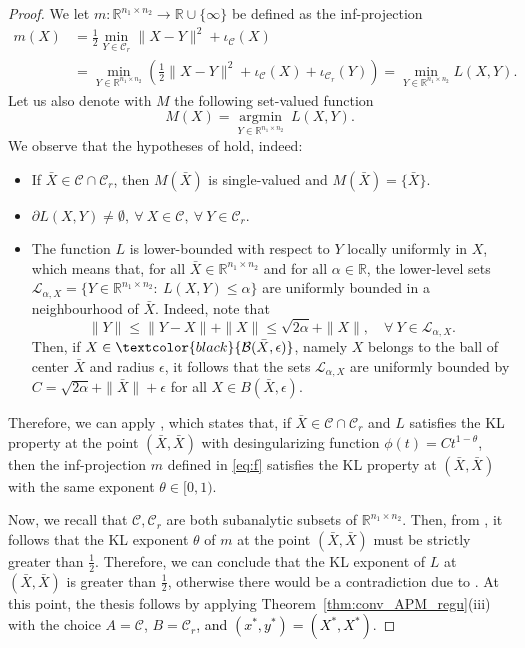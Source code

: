 \documentclass[pdflatex,sn-mathphys-num]{sn-jnl}
\numberwithin{equation}{section}%
\def\R{\mathbb{R}}
\newcommand{\setRank}{{\mathcal{C}_r}}
\newcommand{\setNorm}{{\mathcal{C} }}
\newcommand{\ste}[1]{\textcolor{black}{#1}}
\theoremstyle{thmstyleone}%
\theoremstyle{thmstyletwo}%
\theoremstyle{thmstylethree}%
\begin{document}
{\begin{proof}
We let $m:\R^{n_1\times n_2}\rightarrow \R\cup\{\infty\}$ be defined as the inf-projection
\begin{align}\label{eq:f}
    m(X) &= \frac{1}{2}\min_{Y\in \setRank}\|X-Y\|^2+\iota_\setNorm(X) \nonumber\\
    &= \min_{Y\in\R^{n_1\times n_2}}\left(\frac{1}{2}\|X-Y\|^2+\iota_\setNorm(X)+\iota_\setRank(Y)\right)=\min_{Y\in\R^{n_1\times n_2}}L(X,Y).
\end{align}
Let us also denote with $M$ the following set-valued function
\begin{equation}\label{eq:m}
    M(X) = \underset{Y\in \R^{n_1\times n_2}}{\operatorname{argmin}} \ L(X,Y).
\end{equation}
We observe that the hypotheses of \cite[Theorem 3.1]{Yu2022} hold, indeed:
\begin{itemize}
    \item If $\bar{X}\in \setNorm \cap \setRank$, then $M(\bar{X})$ is single-valued and $M(\bar{X})=\{\bar{X}\}$. 
    \item $\partial L(X,Y)\neq \emptyset, \ \forall \ X\in \setNorm, \ \forall \ Y\in \setRank.$
    \item The function $L$ is lower-bounded with respect to $Y$ locally uniformly in $X$, which means that, for all $\bar{X}\in\R^{n_1\times n_2}$ and for all $\alpha\in\R$, the lower-level sets $\mathcal{L}_{\alpha,X}=\{Y\in\R^{n_1\times n_2}: \ L(X,Y)\leq \alpha\}$ are uniformly bounded in a neighbourhood of $\bar{X}$. Indeed, note that
    \begin{equation*}
        \|Y\|\leq \|Y-X\|+\|X\|\leq \sqrt{2\alpha}+\|X\|, \quad \forall \ Y\in \mathcal{L}_{\alpha,X}.
    \end{equation*}
    Then, if $X\in \ste{\mathcal{B}(\bar{X},\epsilon)}$, namely $X$ belongs to the ball of center $\bar{X}$ and radius $\epsilon$, it follows that the sets $\mathcal{L}_{\alpha,X}$ are uniformly bounded by $C=\sqrt{2\alpha}+\|\bar{X}\|+\epsilon$ for all $X\in B(\bar{X},\epsilon)$.
\end{itemize}
Therefore, we can apply \cite[Theorem 3.1]{Yu2022}, which states that, if $\bar{X}\in \mathcal{C}\cap \mathcal{C}_r$ and $L$ satisfies the KL property at the point $(\bar{X},\bar{X})$ with desingularizing function $\phi(t)=Ct^{1-\theta}$, then the inf-projection $m$ defined in \eqref{eq:f} satisfies the KL property at $(\bar{X},\bar{X})$ with the same exponent $\theta\in[0,1)$. 

Now, we recall that $\mathcal{C},\mathcal{C}_r$ are both subanalytic subsets of $\R^{n_1\times n_2}$. Then, from \cite[Lemma 3]{Noll-etal-2016}, it follows that the KL exponent $\theta$ of $m$ at the point $(\bar{X},\bar{X})$ must be strictly greater than $\frac{1}{2}$. Therefore, we can conclude that the KL exponent of $L$ at $(\bar{X},\bar{X})$ is greater than $\frac{1}{2}$, otherwise there would be a contradiction due to \cite[Theorem 3.1]{Yu2022}. At this point, the thesis follows by applying Theorem~\ref{thm:conv_APM_regu}(iii) with the choice $A=\setNorm$, $B=\setRank$\ste{, and $(x^*,y^*) = (X^*,X^*)$}.
\end{proof}}
\end{document}
